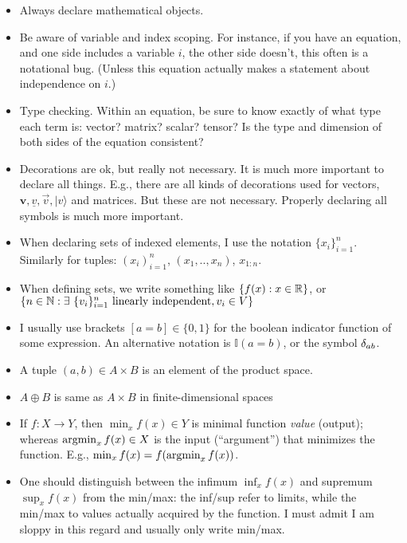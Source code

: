 \begin{itemize}
\item Always declare mathematical objects.
\item Be aware of variable and index scoping. For instance, if you have an
equation, and one side includes a variable $i$, the other side doesn't,
this often is a notational bug. (Unless this equation actually makes
a statement about independence on $i$.)
\item Type checking. Within an equation, be sure to know exactly of
what type each term is: vector? matrix? scalar? tensor? Is the type and dimension of both sides of the equation consistent?
\item Decorations are ok, but really not necessary. It is much more
important to declare all things. E.g., there are all kinds of decorations used for vectors, $\boldsymbol
v, \underline v, \overrightarrow v, |v\rangle$ and matrices. But these are
not necessary. Properly declaring all symbols is much more
important.
\item When declaring sets of indexed elements, I use the notation $\{ x_i \}_{i=1}^n$. Similarly for tuples: $(x_i)_{i=1}^n$,
  $(x_1,..,x_n)$, $x_{1:n}$.
\item When defining sets, we write something like $\{ f(x) : x \in{\mathbb{R}} \}$, or $\{ n \in{\mathbb{N}} : \exists~\{
v_i\}_{i=1}^n~ \text{linearly independent}, v_i \in V\}$
\item I usually use brackets $[a=b] \in \{0,1\}$ for the boolean indicator function of some expression. An alternative notation is $\mathbb I(a=b)$, or the   symbol $\delta_{ab}$.
\item A tuple $(a,b) \in A \times B$ is an element of the product space.
\item {} $A \oplus B$ is same as $A \times B$ in
finite-dimensional spaces
\item If $f: X \to Y$, then $\min_x f(x) \in Y$ is minimal function \emph{value} (output); whereas $\operatorname*{argmin}_x f(x) \in X$ is the input (``argument'') that minimizes the function. E.g., $\min_x f(x) = f(\operatorname*{argmin}_x f(x))$.
\item One should distinguish between the infimum $\inf_x f(x)$ and supremum $\sup_x f(x)$ from the min/max: the inf/sup refer to limits, while the min/max to values actually acquired by the function. I must admit I am sloppy in this regard and usually only write min/max.

\end{itemize}
